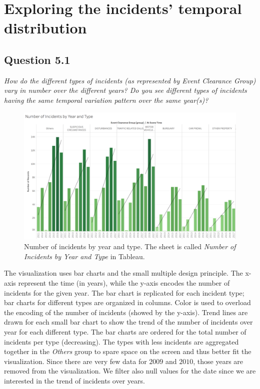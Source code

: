 \section{Exploring the incidents' temporal distribution}

\subsection*{Question 5.1}
\textit{How do the different types of incidents (as represented by Event Clearance Group) vary in number over the different years? Do you see different types of incidents having the same temporal variation pattern over the same year(s)?}

\begin{figure}[h]
	\centering
	\includegraphics[width=0.9\columnwidth]{figures/5_1_incidents_by_type_and_year}
	\caption{Number of incidents by year and type. The sheet is called \textit{Number of Incidents by Year and Type} in Tableau.}
	\label{fig:5_1_incidents_by_type_and_year}
\end{figure}

The visualization uses bar charts and the small multiple design principle.
The x-axis represent the time (in years), while the y-axis encodes the number of incidents for the given year.
The bar chart is replicated for each incident type; bar charts for different types are organized in columns.
Color is used to overload the encoding of the number of incidents (showed by the y-axis).
Trend lines are drawn for each small bar chart to show the trend of the number of incidents over year for each different type.
The bar charts are ordered for the total number of incidents per type (decreasing).
The types with less incidents are aggregated together in the \textit{Others} group to spare space on the screen and thus better fit the visualization.
Since there are very few data for $2009$ and $2010$, those years are removed from the visualization.
We filter also null values for the date since we are interested in the trend of incidents over years.

